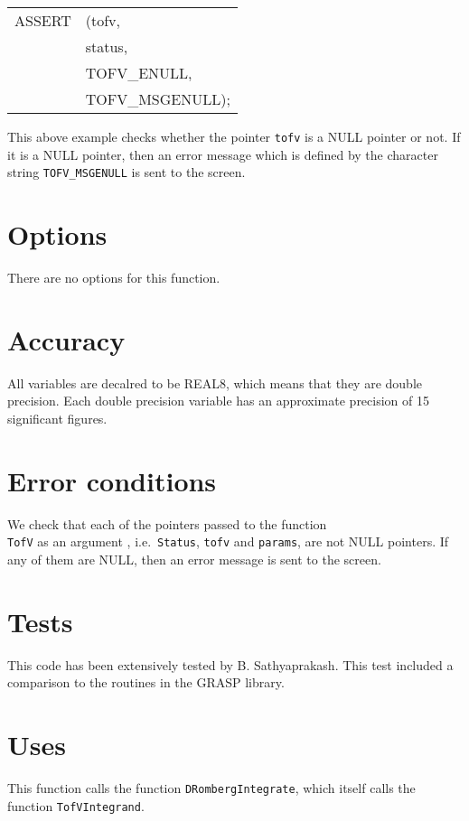\documentclass[12pt]{article}
\begin{document}
\vspace{5mm}

\begin{tabular}{ll}
ASSERT & (tofv,  \\
       &  status,    \\
       &  TOFV\_ENULL, \\
       &  TOFV\_MSGENULL);
\end{tabular}

\vspace{5mm}

This above example checks whether the pointer \texttt{tofv} is a NULL pointer or not. If it is a NULL pointer, then an error message which is defined by the character string \texttt{TOFV\_MSGENULL} is sent to the screen.


\section{Options}

There are no options for this function.


\section{Accuracy}

All variables are decalred to be REAL8, which means that they are double precision.
Each double precision variable has an approximate precision of 15 significant figures.


\section{Error conditions}

We check that each of the pointers passed to the function \\ \texttt{TofV} as an argument , i.e.\ \texttt{Status}, \texttt{tofv} and \texttt{params}, are not NULL pointers. If any of them are NULL, then an error message is sent to the screen.


\section{Tests}

This code has been extensively tested by B. Sathyaprakash. This test included a comparison to the routines in the GRASP library.

\section{Uses}

This function calls the function \texttt{DRombergIntegrate},  which itself calls the function \texttt{TofVIntegrand}.
\end{document}
